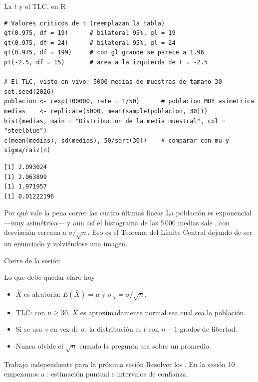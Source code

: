 \documentclass[aspectratio=169,10pt]{beamer}
\begin{document}
\begin{frame}[fragile]{La $t$ y el TLC, en R}
  \scriptsize
\begin{lstlisting}[style=Rmini]
# Valores criticos de t (reemplazan la tabla)
qt(0.975, df = 19)      # bilateral 95%, gl = 19
qt(0.975, df = 24)      # bilateral 95%, gl = 24
qt(0.975, df = 199)     # con gl grande se parece a 1.96
pt(-2.5, df = 15)       # area a la izquierda de t = -2.5

# El TLC, visto en vivo: 5000 medias de muestras de tamano 30
set.seed(2026)
poblacion <- rexp(100000, rate = 1/50)      # poblacion MUY asimetrica
medias    <- replicate(5000, mean(sample(poblacion, 30)))
hist(medias, main = "Distribucion de la media muestral", col = "steelblue")
c(mean(medias), sd(medias), 50/sqrt(30))    # comparar con mu y sigma/raiz(n)
\end{lstlisting}
\begin{lstlisting}[style=Rout]
[1] 2.093024
[1] 2.063899
[1] 1.971957
[1] 0.01222196
\end{lstlisting}

  \vspace{-0.12cm}
  \begin{alertblock}{Por qué vale la pena correr las cuatro últimas líneas}
    \tiny
    La población es exponencial —muy asimétrica— y aun así el histograma de las
    5\,000 medias sale , con desviación cercana a
    $\sigma/\sqrt{n}$. Eso es el Teorema del Límite Central dejando de ser un
    enunciado y volviéndose una imagen.
  \end{alertblock}
\end{frame}

\begin{frame}{Cierre de la sesión}
  \begin{block}{Lo que debe quedar claro hoy}
    \begin{itemize}
      \item $\bar{X}$ es aleatoria: $E(\bar X)=\mu$ y
            $\sigma_{\bar X}=\sigma/\sqrt{n}$.
      \item TLC: con $n\ge 30$, $\bar{X}$ es aproximadamente normal sea cual
            sea la población.
      \item Si se usa $s$ en vez de $\sigma$, la distribución es $t$ con
            $n-1$ grados de libertad.
      \item Nunca olvide el $\sqrt{n}$ cuando la pregunta sea sobre un
            promedio.
    \end{itemize}
  \end{block}

  \vspace{0.2cm}
  \begin{alertblock}{Trabajo independiente para la próxima sesión}
    \footnotesize
    Resolver los . En la sesión
    10 empezamos a : estimación puntual e intervalos de
    confianza.
  \end{alertblock}
\end{frame}
\end{document}
